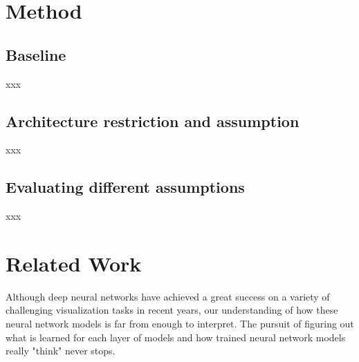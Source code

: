 \documentclass[10pt,twocolumn,letterpaper]{article}
\begin{document}
\section{Method}

\subsection{Baseline}
xxx

\subsection{Architecture restriction and assumption}
xxx

\subsection{Evaluating different assumptions}
xxx

\section{Related Work}
Although deep neural networks have achieved a great success on a variety of challenging visualization tasks in recent years, our understanding of how these neural network models is far from enough to interpret.
The pursuit of figuring out what is learned for each layer of models and how trained neural network models really "think" never stops.
\end{document}
